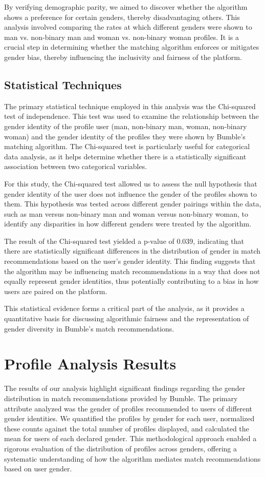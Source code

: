 By verifying demographic parity, we aimed to discover whether the algorithm shows a preference for certain genders, thereby disadvantaging others. This analysis involved comparing the rates at which different genders were shown to man vs. non-binary man and woman vs. non-binary woman profiles. It is a crucial step in determining whether the matching algorithm enforces or mitigates gender bias, thereby influencing the inclusivity and fairness of the platform.

\subsection{Statistical Techniques}
The primary statistical technique employed in this analysis was the Chi-squared test of independence. This test was used to examine the relationship between the gender identity of the profile user (man, non-binary man, woman, non-binary woman) and the gender identity of the profiles they were shown by Bumble's matching algorithm. The Chi-squared test is particularly useful for categorical data analysis, as it helps determine whether there is a statistically significant association between two categorical variables.

For this study, the Chi-squared test allowed us to assess the null hypothesis that gender identity of the user does not influence the gender of the profiles shown to them. This hypothesis was tested across different gender pairings within the data, such as man versus non-binary man and woman versus non-binary woman, to identify any disparities in how different genders were treated by the algorithm.

The result of the Chi-squared test yielded a p-value of 0.039, indicating that there are statistically significant differences in the distribution of gender in match recommendations based on the user’s gender identity. This finding suggests that the algorithm may be influencing match recommendations in a way that does not equally represent gender identities, thus potentially contributing to a bias in how users are paired on the platform.

This statistical evidence forms a critical part of the analysis, as it provides a quantitative basis for discussing algorithmic fairness and the representation of gender diversity in Bumble's match recommendations.

\section{Profile Analysis Results}
The results of our analysis highlight significant findings regarding the gender distribution in match recommendations provided by Bumble. The primary attribute analyzed was the gender of profiles recommended to users of different gender identities. We quantified the profiles by gender for each user, normalized these counts against the total number of profiles displayed, and calculated the mean for users of each declared gender. This methodological approach enabled a rigorous evaluation of the distribution of profiles across genders, offering a systematic understanding of how the algorithm mediates match recommendations based on user gender.

